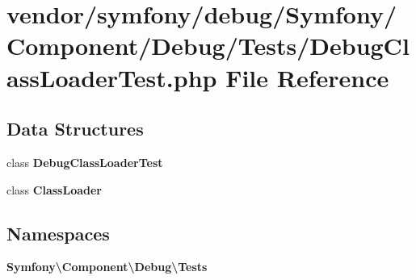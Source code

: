 \section{vendor/symfony/debug/\+Symfony/\+Component/\+Debug/\+Tests/\+Debug\+Class\+Loader\+Test.php File Reference}
\label{_debug_class_loader_test_8php}
\subsection*{Data Structures}
\begin{DoxyCompactItemize}
\item 
class {\bf Debug\+Class\+Loader\+Test}
\item 
class {\bf Class\+Loader}
\end{DoxyCompactItemize}
\subsection*{Namespaces}
\begin{DoxyCompactItemize}
\item 
 {\bf Symfony\textbackslash{}\+Component\textbackslash{}\+Debug\textbackslash{}\+Tests}
\end{DoxyCompactItemize}
